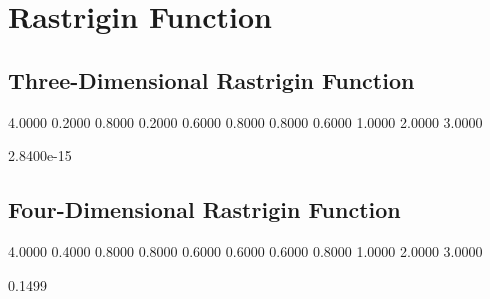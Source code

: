 \section{Rastrigin Function}

\subsection{Three-Dimensional Rastrigin Function}

4.0000    0.2000    0.8000    0.2000    0.6000    0.8000    0.8000    0.6000    1.0000    2.0000    3.0000

2.8400e-15

\subsection{Four-Dimensional Rastrigin Function}

4.0000    0.4000    0.8000    0.8000    0.6000    0.6000    0.6000    0.8000    1.0000    2.0000    3.0000

0.1499

